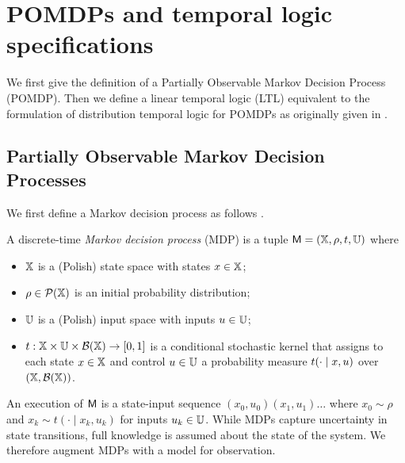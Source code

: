\documentclass{ifacconf}
\newcommand{\new}[1]{{\color{blue}#1}}
\newcommand{\cristi}[1]{{\color{orange}#1}}
\begin{document}
\section{POMDPs and temporal logic specifications}

We first give the definition of a Partially Observable Markov Decision Process (POMDP). Then we define a linear temporal logic (LTL) equivalent to the formulation of distribution temporal logic for POMDPs as originally given in \citep{JonesDTL2013}.

\subsection{Partially Observable Markov  Decision Processes}

We first define a Markov decision process as follows \citep{hll1996}.
\begin{definition}
\label{def:MDP}
  A discrete-time \emph{Markov decision process} (MDP) is a tuple $\mathsf{M} = ({\mathbb{X}}, \rho, t, {\mathbb{U}})$ where
  \begin{itemize}
    \item ${\mathbb{X}}$ is a \new{(Polish)} state space with states $x\in{\mathbb{X}}$; %
    \item $\rho \in \mathcal P({\mathbb{X}})$ is an initial probability distribution;
    \item ${\mathbb{U}}$ is a \new{(Polish)} input space with inputs $u\in{\mathbb{U}}$;
    \item $t:{\mathbb{X}}\times{\mathbb{U}}\times\mathcal B({\mathbb{X}})\rightarrow[0,1]$ is a conditional stochastic kernel that assigns to each state $x\in {\mathbb{X}}$ and control $u\in {\mathbb{U}}$ a probability measure $t(\cdot\mid x,u)$ over $({\mathbb{X}},\mathcal B({\mathbb{X}}))$.
  \end{itemize}
\end{definition}

An execution of $\mathsf{M}$ is a state-input sequence $(x_0, u_0)(x_1, u_1)\ldots$ where $x_0 \sim \rho$ and $x_k \sim t(\cdot \mid x_k, u_k)$ for inputs $u_k \in {\mathbb{U}}$. While MDPs capture uncertainty in state transitions, full knowledge is assumed about the state of the system. We therefore augment MDPs with a model for observation.

\end{document}
